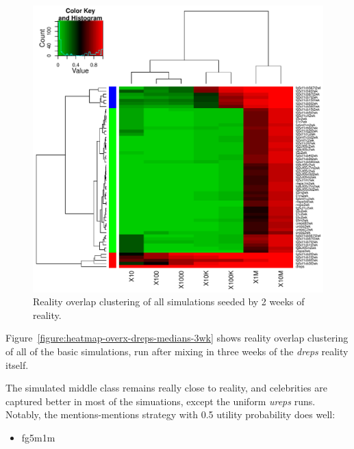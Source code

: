 \documentclass[10pt,oneside]{memoir}
\begin{document}
\begin{Spacing}{2}
\begin{figure}
\begin{center}
    \includegraphics{figures/crop/heatmap-overx-dreps-medians-2wk}
    \caption{Reality overlap clustering of all simulations seeded by 2 weeks of reality.}
    \label{figure:heatmap-overx-dreps-medians-2wk}
\end{center}
\end{figure}
Figure~\ref{figure:heatmap-overx-dreps-medians-3wk} shows reality overlap clustering of all of the basic simulations, run after mixing in three weeks of the {\itshape dreps} reality itself.


The simulated middle class remains really close to reality, and celebrities are captured better in most of the simuations, except the uniform {\itshape ureps} runs.
Notably, the mentions-mentions strategy with 0.5 utility probability does well:


\begin{itemize}


\item fg5m1m
\end{itemize}



\end{Spacing}
\end{document}
